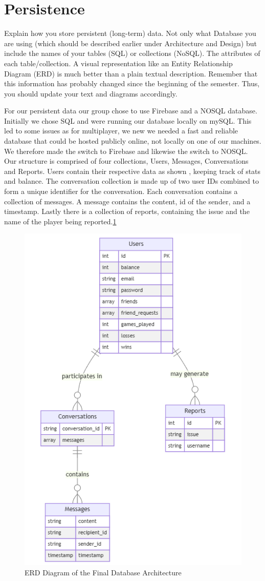 \section{Persistence}

Explain how you store persistent (long-term) data. Not only what Database you are using
(which should be described earlier under Architecture and Design) but include the names of
your tables (SQL) or collections (NoSQL). The attributes of each table/collection. A visual
representation like an Entity Relationship Diagram (ERD) is much better than a plain textual
description. Remember that this information has probably changed since the beginning of
the semester. Thus, you should update your text and diagrams accordingly.

For our persistent data our group chose to use Firebase and a NOSQL database. Initially we chose SQL and were running our database locally on mySQL. This led to some issues as for multiplayer, we new we needed a fast and reliable database that could be hosted publicly online, not locally on one of our machines. We therefore made the switch to Firebase and likewise the switch to NOSQL. Our structure is comprised of four collections, Users, Messages, Conversations and Reports. Users contain their respective data as shown , keeping track of stats and balance. The conversation collection is made up of two user IDs combined to form a unique identifier for the conversation. Each conversation contains a collection of messages. A message contains the content, id of the sender, and a timestamp. Lastly there is a collection of reports, containing the issue and the name of the player being reported.\ref{fig:erd_diagram}

\begin{figure}[H]
    \centering
    \includegraphics[scale=0.7]{finalERDdiagram.png}
    \caption{ERD Diagram of the Final Database Architecture}
    \label{fig:erd_diagram}
\end{figure}
